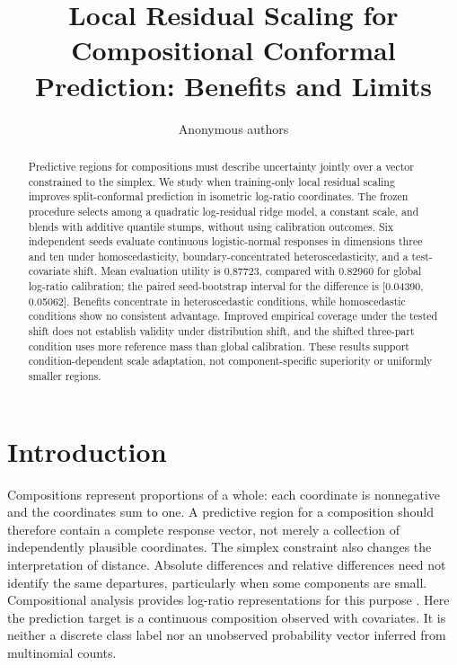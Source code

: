 \documentclass{article}
\title{Local Residual Scaling for Compositional Conformal Prediction: Benefits and Limits}
\author{Anonymous authors}
\begin{document}
\maketitle

\begin{abstract}
Predictive regions for compositions must describe uncertainty jointly over a vector constrained to the simplex. We study when training-only local residual scaling improves split-conformal prediction in isometric log-ratio coordinates. The frozen procedure selects among a quadratic log-residual ridge model, a constant scale, and blends with additive quantile stumps, without using calibration outcomes. Six independent seeds evaluate continuous logistic-normal responses in dimensions three and ten under homoscedasticity, boundary-concentrated heteroscedasticity, and a test-covariate shift. Mean evaluation utility is 0.87723, compared with 0.82960 for global log-ratio calibration; the paired seed-bootstrap interval for the difference is [0.04390, 0.05062]. Benefits concentrate in heteroscedastic conditions, while homoscedastic conditions show no consistent advantage. Improved empirical coverage under the tested shift does not establish validity under distribution shift, and the shifted three-part condition uses more reference mass than global calibration. These results support condition-dependent scale adaptation, not component-specific superiority or uniformly smaller regions.
\end{abstract}

\section{Introduction}
Compositions represent proportions of a whole: each coordinate is nonnegative and the coordinates sum to one. A predictive region for a composition should therefore contain a complete response vector, not merely a collection of independently plausible coordinates. The simplex constraint also changes the interpretation of distance. Absolute differences and relative differences need not identify the same departures, particularly when some components are small. Compositional analysis provides log-ratio representations for this purpose \citep{Aitchison1982,Egozcue2003}. Here the prediction target is a continuous composition observed with covariates. It is neither a discrete class label nor an unobserved probability vector inferred from multinomial counts.
\end{document}
